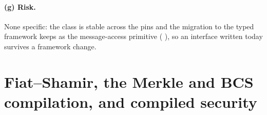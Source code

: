 \paragraph{(g) Risk.}
None specific: the class is stable across the pins and the migration to the typed framework
keeps  as the message-access primitive
(
), so an
interface written today survives a framework change.

\section{Fiat--Shamir, the Merkle and BCS compilation, and compiled security}\label{sec:ark-fs}

